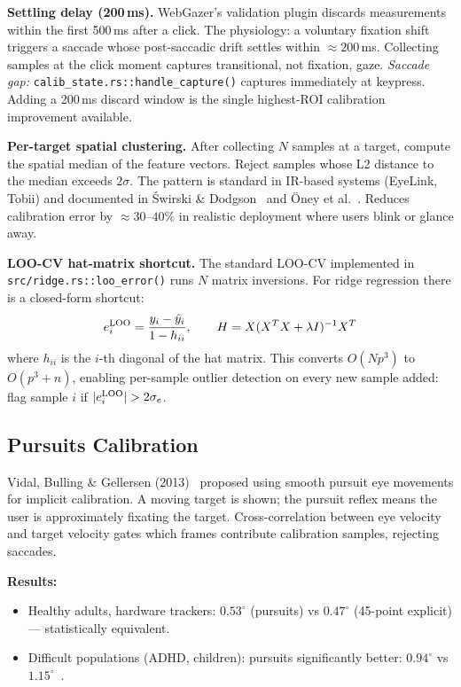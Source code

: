 \documentclass[11pt,a4paper]{article}
\begin{document}
\textbf{Settling delay (200\,ms).}
WebGazer's validation plugin discards measurements within the first 500\,ms after a click.
The physiology: a voluntary fixation shift triggers a saccade whose post-saccadic drift
settles within $\approx200$\,ms.
Collecting samples at the click moment captures transitional, not fixation, gaze.
\emph{Saccade gap:} \texttt{calib\_state.rs::handle\_capture()} captures immediately at keypress.
Adding a 200\,ms discard window is the single highest-ROI calibration improvement available.

\textbf{Per-target spatial clustering.}
After collecting $N$ samples at a target, compute the spatial median of the feature vectors.
Reject samples whose L2 distance to the median exceeds $2\sigma$.
The pattern is standard in IR-based systems (EyeLink, Tobii) and documented
in Świrski \& Dodgson~\cite{swirski2014calibration} and Öney et al.~\cite{oney2022efficient}.
Reduces calibration error by $\approx30$--$40\%$ in realistic deployment where users
blink or glance away.

\textbf{LOO-CV hat-matrix shortcut.}
The standard LOO-CV implemented in \texttt{src/ridge.rs::loo\_error()} runs $N$ matrix
inversions.
For ridge regression there is a closed-form shortcut:
\[
  e_i^{\rm LOO} = \frac{y_i - \hat{y}_i}{1 - h_{ii}},
  \qquad
  H = X(X^T X + \lambda I)^{-1} X^T
\]
where $h_{ii}$ is the $i$-th diagonal of the hat matrix.
This converts $O(Np^3)$ to $O(p^3 + n)$, enabling per-sample outlier detection on every
new sample added: flag sample $i$ if $|e_i^{\rm LOO}| > 2\sigma_{e}$.

\subsection{Pursuits Calibration}

Vidal, Bulling \& Gellersen (2013)~\cite{vidal2013pursuits} proposed using smooth pursuit eye movements for implicit calibration.
A moving target is shown; the pursuit reflex means the user is approximately fixating the target.
Cross-correlation between eye velocity and target velocity gates which frames contribute calibration samples, rejecting saccades.

\textbf{Results:}
\begin{itemize}
  \item Healthy adults, hardware trackers: $0.53^\circ$ (pursuits) vs $0.47^\circ$ (45-point explicit) --- statistically equivalent.
  \item Difficult populations (ADHD, children): pursuits significantly better: $0.94^\circ$ vs $1.15^\circ$~\cite{nystrom2020pursuits}.
\end{itemize}
\end{document}
